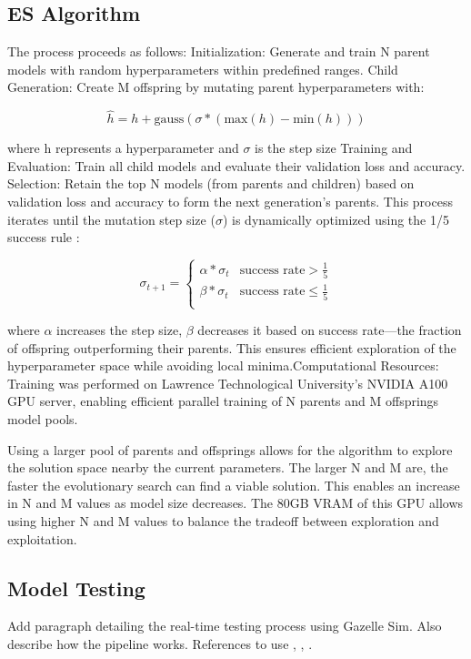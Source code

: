 \documentclass[conference]{IEEEtran}
\begin{document}
\subsection{ES Algorithm}
The process proceeds as follows:
Initialization: Generate and train N parent models with random hyperparameters within predefined ranges.
Child Generation: Create M offspring by mutating parent hyperparameters with:

\begin{equation}
    \hat{h} = h + \text{gauss}(\sigma * (\text{max}(h) - \text{min}(h)))
\end{equation}


where h represents a hyperparameter and $\sigma$ is the step size
Training and Evaluation: Train all child models and evaluate their validation loss and accuracy.
Selection: Retain the top N models (from parents and children) based on validation loss and accuracy to form the next generation's parents.
This process iterates until the mutation step size ($\sigma$) is dynamically optimized using the 1/5 success rule \cite{ES_one_fifth_rule}:

\begin{equation}
    \sigma_{t+1} = \left\{
    \begin{array}{ll}
        \alpha * \sigma_t & \text{success rate} > \frac{1}{5}    \\
        \beta * \sigma_t  & \text{success rate} \leq \frac{1}{5} \\
    \end{array}
    \right.
\end{equation}


where $\alpha$ increases the step size, $\beta$ decreases it based on success rate—the fraction of offspring outperforming their parents. This ensures efficient exploration of the hyperparameter space while avoiding local minima.Computational Resources: Training was performed on Lawrence Technological University’s NVIDIA A100 GPU server, enabling efficient parallel training of N parents and M offsprings model pools.

Using a larger pool of parents and offsprings allows for the algorithm to explore the solution space nearby the current parameters. The larger N and M are, the faster the evolutionary search can find a viable solution. This enables an increase in N and M values as model size decreases. The 80GB VRAM of this GPU allows using higher N and M values to balance the tradeoff between exploration and exploitation.

\subsection{Model Testing}
Add paragraph detailing the real-time testing process using Gazelle Sim. Also describe how the pipeline works. References to use \cite{CNN_can_self_drive}, \cite{lane_detection_good_results_zigzag}, \cite{KITTI_dataset}.
\end{document}
